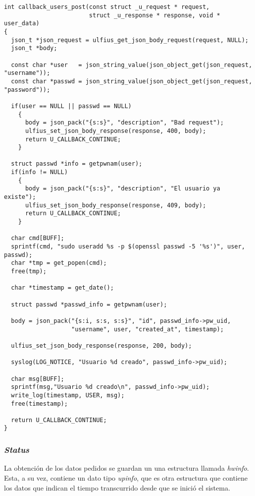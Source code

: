 \documentclass[12pt,a4paper]{article}
\begin{document}
\begin{lstlisting}[caption={\emph{Endpoint /users, POST method.}}, label={post}, language=Ce]
int callback_users_post(const struct _u_request * request,
                        struct _u_response * response, void * user_data)
{
  json_t *json_request = ulfius_get_json_body_request(request, NULL);
  json_t *body;

  const char *user   = json_string_value(json_object_get(json_request, "username"));
  const char *passwd = json_string_value(json_object_get(json_request, "password"));

  if(user == NULL || passwd == NULL)
    {
      body = json_pack("{s:s}", "description", "Bad request");
      ulfius_set_json_body_response(response, 400, body);
      return U_CALLBACK_CONTINUE;
    }

  struct passwd *info = getpwnam(user);
  if(info != NULL)
    {
      body = json_pack("{s:s}", "description", "El usuario ya existe");
      ulfius_set_json_body_response(response, 409, body);
      return U_CALLBACK_CONTINUE;
    }

  char cmd[BUFF];
  sprintf(cmd, "sudo useradd %s -p $(openssl passwd -5 '%s')", user, passwd);
  char *tmp = get_popen(cmd);
  free(tmp);

  char *timestamp = get_date();

  struct passwd *passwd_info = getpwnam(user);

  body = json_pack("{s:i, s:s, s:s}", "id", passwd_info->pw_uid,
                   "username", user, "created_at", timestamp);

  ulfius_set_json_body_response(response, 200, body);

  syslog(LOG_NOTICE, "Usuario %d creado", passwd_info->pw_uid);

  char msg[BUFF];
  sprintf(msg,"Usuario %d creado\n", passwd_info->pw_uid);
  write_log(timestamp, USER, msg);
  free(timestamp);

  return U_CALLBACK_CONTINUE;
}
\end{lstlisting}

\subsubsection{\emph{Status}}
\label{status}
La obtención de los datos pedidos se guardan un una estructura llamada
\emph{hwinfo}. Esta, a su vez, contiene un dato tipo \emph{upinfo}, que es otra
estructura que contiene los datos que indican el tiempo transcurrido desde que
se inició el sistema.
\end{document}
